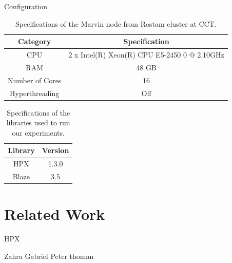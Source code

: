 \documentclass[10pt]{beamer}
\begin{document}
\begin{frame}{Configuration}
	\begin{outline}
	\vspace{\baselineskip}	
	\begin{table}[H]
		\centering
		\scalebox{0.75}
		{\begin{tabular}{|c | c |} 
				\hline
				
				Category & Specification\\
				\hline
				\hline
				CPU &  2 x Intel(R) Xeon(R) CPU E5-2450 0 @ 2.10GHz \\ [0.5ex] 
				\hline
				RAM & 48 GB\\ 	
				\hline
				Number of Cores & 16\\
				\hline	
				Hyperthreading & Off \\
				\hline			
		\end{tabular}}	
		\caption{Specifications of the Marvin node from Rostam cluster at CCT.}
		\label{table3}
	\end{table} 
\begin{table}[H]
	\centering
	\scalebox{0.75}
	{\begin{tabular}{|c | c |} 
			\hline
			Library & Version \\
			\hline
			\hline
			HPX & 1.3.0 \\ 
			\hline
			Blaze & 3.5\\ 	
			\hline
			
	\end{tabular}}	
	\caption{Specifications of the libraries used to run our experiments.}
	\label{table5}
\end{table}
	\end{outline}
\end{frame}

\section{Related Work}
	\begin{frame}{HPX}
		\begin{outline}
			\1Zahra
			\1Gabriel
			\1Peter thoman
		\end{outline}
\end{frame}
\end{document}
